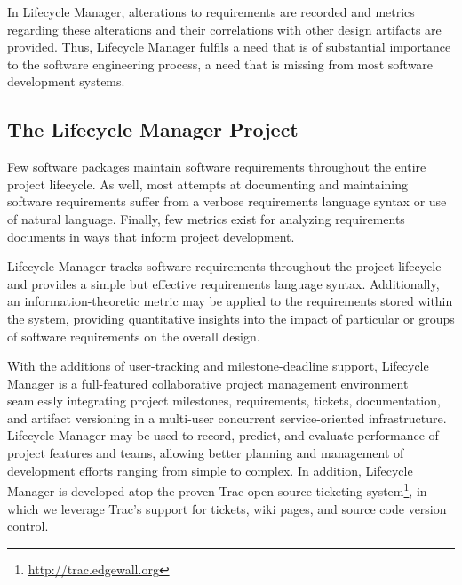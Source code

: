 \documentclass[letterpaper,10pt]{article}
\begin{document}
        In Lifecycle Manager, alterations to requirements are recorded
        and metrics regarding these alterations and their correlations
        with other design artifacts are provided.  Thus, Lifecycle
        Manager fulfils a need that is of substantial importance to
        the software engineering process, a need that is missing from
        most software development systems.

        \subsection{The Lifecycle Manager Project}

        Few software packages maintain software requirements
        throughout the entire project lifecycle. As well, most
        attempts at documenting and maintaining software requirements
        suffer from a verbose requirements language syntax or use of
        natural language. Finally, few metrics exist for analyzing
        requirements documents in ways that inform project
        development.

        Lifecycle Manager tracks software requirements throughout the
        project lifecycle and provides a simple but effective
        requirements language syntax. Additionally, an
        information-theoretic metric may be applied to the
        requirements stored within the system, providing quantitative
        insights into the impact of particular or groups of software
        requirements on the overall design.

        With the additions of user-tracking and milestone-deadline
        support, Lifecycle Manager is a full-featured collaborative
        project management environment seamlessly integrating project
        milestones, requirements, tickets, documentation, and artifact
        versioning in a multi-user concurrent service-oriented
        infrastructure. Lifecycle Manager may be used to record,
        predict, and evaluate performance of project features and
        teams, allowing better planning and management of development
        efforts ranging from simple to complex. In addition, Lifecycle
        Manager is developed atop the proven Trac open-source
        ticketing system\footnote{\url{http://trac.edgewall.org}}, in
        which we leverage Trac's support for tickets, wiki pages, and
        source code version control.
            
\end{document}

